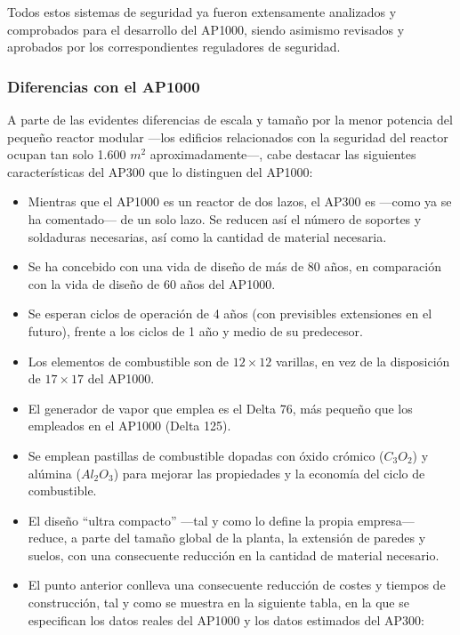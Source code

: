 Todos estos sistemas de seguridad ya fueron extensamente analizados y comprobados para el desarrollo del AP1000, siendo asimismo revisados y aprobados por los correspondientes reguladores de seguridad.


\subsubsection{Diferencias con el AP1000}

A parte de las evidentes diferencias de escala y tamaño por la menor potencia del pequeño reactor modular ---los edificios relacionados con la seguridad del reactor ocupan tan solo 1.600 $m^2$ aproximadamente---, cabe destacar las siguientes características del AP300 que lo distinguen del AP1000:

\begin{itemize}
  \item Mientras que el AP1000 es un reactor de dos lazos, el AP300 es ---como ya se ha comentado--- de un solo lazo. Se reducen así el número de soportes y soldaduras necesarias, así como la cantidad de material necesaria.
  \item Se ha concebido con una vida de diseño de más de 80 años, en comparación con la vida de diseño de 60 años del AP1000. 
  \item Se esperan ciclos de operación de 4 años (con previsibles extensiones en el futuro), frente a los ciclos de 1 año y medio de su predecesor.
  \item Los elementos de combustible son de $12 \times  12$ varillas, en vez de la disposición de $17 \times 17$ del AP1000.
  \item El generador de vapor que emplea es el Delta 76, más pequeño que los empleados en el AP1000 (Delta 125).
  \item Se emplean pastillas de combustible dopadas con óxido crómico ($C_3O_2$) y alúmina ($Al_2O_3$) para mejorar las propiedades y la economía del ciclo de combustible.
  \item El diseño ``ultra compacto'' ---tal y como lo define la propia empresa--- reduce, a parte del tamaño global de la planta, la extensión de paredes y suelos, con una consecuente reducción en la cantidad de material necesario.
  \item El punto anterior conlleva una consecuente reducción de costes y tiempos de construcción, tal y como se muestra en la siguiente tabla, en la que se especifican los datos reales del AP1000 y los datos estimados del AP300:
\end{itemize}

